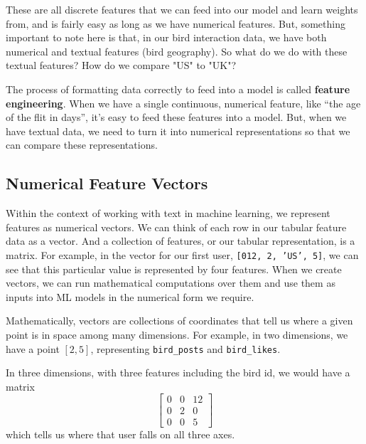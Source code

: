 \documentclass[11pt, table]{diazessay} %
\begin{document}
\begin{sloppypar}
These are all discrete features that we can feed into our model and learn weights from, and is fairly easy as long as we have numerical features.  But, something important to note here is that, in our bird interaction data, we have both numerical and textual features (bird geography). So what do we do with these textual features? How do we compare "US" to "UK"?

The process of formatting data correctly to feed into a model is called \textbf{feature engineering}. When we have a single continuous, numerical feature, like “the age of the flit in days”, it’s easy to feed these features into a model. But, when we have textual data, we need to turn it into numerical representations so that we can compare these representations.  

\subsection{Numerical Feature Vectors}
Within the context of working with text in machine learning, we represent features as numerical vectors. We can think of each row in our tabular feature data as a vector. And a collection of features, or our tabular representation, is a matrix. For example, in the vector for our first user, \texttt{[012, 2, 'US', 5]}, we can see that this particular value is represented by four features. When we create vectors, we can run mathematical computations over them and use them as inputs into ML models in the numerical form we require.

Mathematically, vectors are collections of coordinates that tell us where a given point is in space among many dimensions. For example, in two dimensions, we have a point $[2,5]$, representing \texttt{bird_posts} and \texttt{bird_likes}.


In three dimensions, with three features including the bird id, we would have a matrix
\begin{equation}
\begin{bmatrix}
0 & 0 & 12\\
0& 2& 0 \\
0& 0& 5
\end{bmatrix}
\end{equation}
which tells us where that user falls on all three axes.

\begin{figure}[htbp]
\begin{adjustbox}{center}
\begin{tikzpicture}
[scale=3, tdplot_main_coords, axis/.style={->,blue,thick},
vector/.style={-stealth,azure,very thick},
vector guide/.style={dashed,azure,thick}]


\end{tikzpicture}
\end{adjustbox}
\end{figure}
\end{sloppypar}
\end{document}
